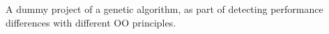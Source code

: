 A dummy project of a genetic algorithm, as part of detecting performance differences with different OO principles. 